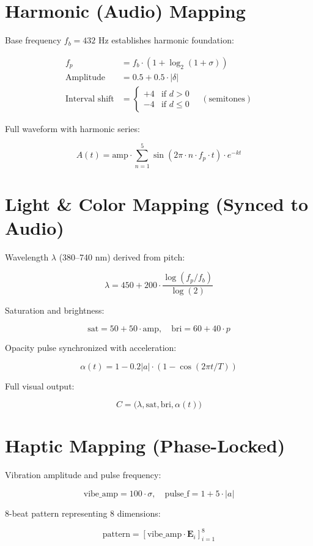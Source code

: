 \documentclass[11pt,a4paper]{article}
\begin{document}
\section{Harmonic (Audio) Mapping}
Base frequency $f_b = 432$ Hz establishes harmonic foundation:

\begin{align}
f_p &= f_b \cdot \left(1 + \log_2(1 + \sigma)\right) \\
\text{Amplitude} &= 0.5 + 0.5 \cdot |\delta| \\
\text{Interval shift} &= \begin{cases} 
+4 & \text{if } d > 0 \\
-4 & \text{if } d \leq 0 
\end{cases} \quad (\text{semitones})
\end{align}

Full waveform with harmonic series:

$$
A(t) = \text{amp} \cdot \sum_{n=1}^{5} \sin(2\pi \cdot n \cdot f_p \cdot t) \cdot e^{-k t}
$$

\section{Light \& Color Mapping (Synced to Audio)}
Wavelength $\lambda$ (380--740 nm) derived from pitch:

$$
\lambda = 450 + 200 \cdot \frac{\log(f_p / f_b)}{\log(2)}
$$

Saturation and brightness:

$$
\text{sat} = 50 + 50 \cdot \text{amp}, \quad \text{bri} = 60 + 40 \cdot p
$$

Opacity pulse synchronized with acceleration:

$$
\alpha(t) = 1 - 0.2 |a| \cdot (1 - \cos(2\pi t / T))
$$

Full visual output:

$$
C = \bigl( \lambda, \text{sat}, \text{bri}, \alpha(t) \bigr)
$$

\section{Haptic Mapping (Phase-Locked)}
Vibration amplitude and pulse frequency:

$$
\text{vibe\_amp} = 100 \cdot \sigma, \quad \text{pulse\_f} = 1 + 5 \cdot |a|
$$

8-beat pattern representing 8 dimensions:

$$
\text{pattern} = [\text{vibe\_amp} \cdot \mathbf{E}_i]_{i=1}^{8}
$$
\end{document}
